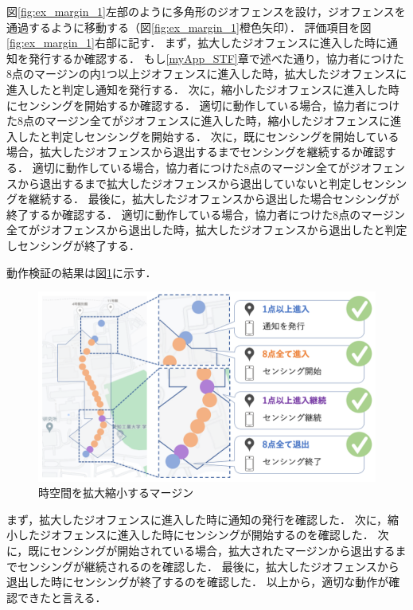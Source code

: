 図\ref{fig:ex_margin_1}左部のように多角形のジオフェンスを設け，ジオフェンスを通過するように移動する（図\ref{fig:ex_margin_1}橙色矢印）．
評価項目を図\ref{fig:ex_margin_1}右部に記す．
まず，拡大したジオフェンスに進入した時に通知を発行するか確認する．
もし\ref{myApp_STF}章で述べた通り，協力者につけた8点のマージンの内1つ以上ジオフェンスに進入した時，拡大したジオフェンスに進入したと判定し通知を発行する．
次に，縮小したジオフェンスに進入した時にセンシングを開始するか確認する．
適切に動作している場合，協力者につけた8点のマージン全てがジオフェンスに進入した時，縮小したジオフェンスに進入したと判定しセンシングを開始する．
次に，既にセンシングを開始している場合，拡大したジオフェンスから退出するまでセンシングを継続するか確認する．
適切に動作している場合，協力者につけた8点のマージン全てがジオフェンスから退出するまで拡大したジオフェンスから退出していないと判定しセンシングを継続する．
最後に，拡大したジオフェンスから退出した場合センシングが終了するか確認する．
適切に動作している場合，協力者につけた8点のマージン全てがジオフェンスから退出した時，拡大したジオフェンスから退出したと判定しセンシングが終了する．

動作検証の結果は図\ref{fig:ex_margin_2}に示す．

\begin{figure}[tbh]
    \centering
    \includegraphics[width=16cm]{img_ex_margin_2.png}
    \caption{時空間を拡大縮小するマージン}
    \label{fig:ex_margin_2}
\end{figure}

まず，拡大したジオフェンスに進入した時に通知の発行を確認した．
次に，縮小したジオフェンスに進入した時にセンシングが開始するのを確認した．
次に，既にセンシングが開始されている場合，拡大されたマージンから退出するまでセンシングが継続されるのを確認した．
最後に，拡大したジオフェンスから退出した時にセンシングが終了するのを確認した．
以上から，適切な動作が確認できたと言える．

